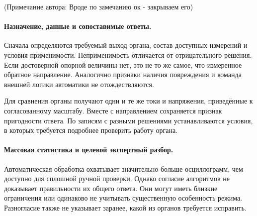 (Примечание автора: Вроде по замечанию ок - закрываем его)
\fi

\paragraph{Назначение, данные и сопоставимые ответы.}

{}

Сначала определяются требуемый выход органа,
состав доступных измерений и условия применимости.
Неприменимость отличается от отрицательного решения.
Если достоверной опорной величины нет,
это не то же самое, что измеренное обратное направление.
Аналогично признаки наличия повреждения
и команда внешней логики автоматики не отождествляются.

Для сравнения органы получают одни и те же токи и напряжения,
приведённые к согласованному масштабу. Вместе с направлением
сохраняется признак пригодности ответа. По записям с разными
решениями устанавливаются условия, в которых требуется
подробнее проверить работу органа.

\paragraph{Массовая статистика и целевой экспертный разбор.}

{}

Автоматическая обработка охватывает значительно
больше осциллограмм, чем доступно для сплошной
ручной проверки. Однако согласие алгоритмов
не доказывает правильности их общего ответа.
Они могут иметь близкие ограничения или одинаково
не учитывать существенную особенность режима.
Разногласие также не указывает заранее,
какой из органов требуется исправить.

